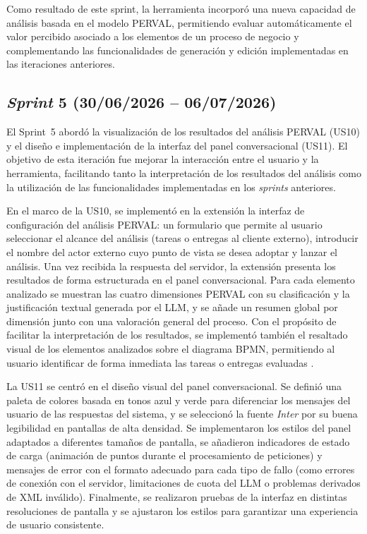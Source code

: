 Como resultado de este sprint, la herramienta incorporó una nueva capacidad de análisis basada en el modelo PERVAL, permitiendo evaluar automáticamente el valor percibido asociado a los elementos de un proceso de negocio y complementando las funcionalidades de generación y edición implementadas en las iteraciones anteriores.


\subsection{\textit{Sprint} 5 (30/06/2026 -- 06/07/2026)}
\label{subsec:sprint5}

El Sprint~5 abordó la visualización de los resultados del análisis PERVAL (US10) y el diseño e implementación de la interfaz del panel conversacional (US11). El objetivo de esta iteración fue mejorar la interacción entre el usuario y la herramienta, facilitando tanto la interpretación de los resultados del análisis como la utilización de las funcionalidades implementadas en los \textit{sprints} anteriores.

En el marco de la US10, se implementó en la extensión la interfaz de configuración del análisis PERVAL: un formulario que permite al usuario seleccionar el alcance del análisis (tareas o entregas al cliente externo), introducir el nombre del actor externo cuyo punto de vista se desea adoptar y lanzar el análisis. Una vez recibida la respuesta del servidor, la extensión presenta los resultados de forma estructurada en el panel conversacional. Para cada elemento analizado se muestran las cuatro dimensiones PERVAL con su clasificación y la justificación textual generada por el LLM, y se añade un resumen global por dimensión junto con una valoración general del proceso. Con el propósito de facilitar la interpretación de los resultados, se implementó también el resaltado visual de los elementos analizados sobre el diagrama BPMN, permitiendo al usuario identificar de forma inmediata las tareas o entregas evaluadas .

La US11 se centró en el diseño visual del panel conversacional. Se definió una paleta de colores basada en tonos azul y verde para diferenciar los mensajes del usuario de las respuestas del sistema, y se seleccionó la fuente \textit{Inter} por su buena legibilidad en pantallas de alta densidad. Se implementaron los estilos del panel adaptados a diferentes tamaños de pantalla, se añadieron indicadores de estado de carga (animación de puntos durante el procesamiento de peticiones) y mensajes de error con el formato adecuado para cada tipo de fallo (como errores de conexión con el servidor, limitaciones de cuota del LLM o problemas derivados de XML inválido). Finalmente, se realizaron pruebas de la interfaz en distintas resoluciones de pantalla y se ajustaron los estilos para garantizar una experiencia de usuario consistente.

